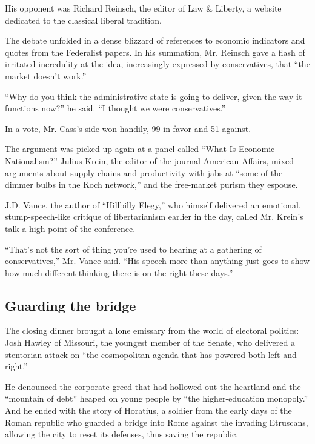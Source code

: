 His opponent was Richard Reinsch, the editor of Law \& Liberty, a
website dedicated to the classical liberal tradition.

The debate unfolded in a dense blizzard of references to economic
indicators and quotes from the Federalist papers. In his summation, Mr.
Reinsch gave a flash of irritated incredulity at the idea, increasingly
expressed by conservatives, that ``the market doesn't work.''

``Why do you think
\href{https://www.nytimes3xbfgragh.onion/2018/03/26/us/politics/trump-judges-courts-administrative-state.html}{the
administrative state} is going to deliver, given the way it functions
now?'' he said. ``I thought we were conservatives.''

In a vote, Mr. Cass's side won handily, 99 in favor and 51 against.

The argument was picked up again at a panel called ``What Is Economic
Nationalism?'' Julius Krein, the editor of the journal
\href{https://www.nytimes3xbfgragh.onion/2017/03/08/arts/american-affairs-journal-donald-trump.html}{American
Affairs}, mixed arguments about supply chains and productivity with jabs
at ``some of the dimmer bulbs in the Koch network,'' and the free-market
purism they espouse.

J.D. Vance, the author of ``Hillbilly Elegy,'' who himself delivered an
emotional, stump-speech-like critique of libertarianism earlier in the
day, called Mr. Krein's talk a high point of the conference.

``That's not the sort of thing you're used to hearing at a gathering of
conservatives,'' Mr. Vance said. ``His speech more than anything just
goes to show how much different thinking there is on the right these
days.''

\hypertarget{guarding-the-bridge}{%
\subsection{Guarding the bridge}\label{guarding-the-bridge}}

The closing dinner brought a lone emissary from the world of electoral
politics: Josh Hawley of Missouri, the youngest member of the Senate,
who delivered a stentorian attack on ``the cosmopolitan agenda that has
powered both left and right.''

He denounced the corporate greed that had hollowed out the heartland and
the ``mountain of debt'' heaped on young people by ``the
higher-education monopoly.'' And he ended with the story of Horatius, a
soldier from the early days of the Roman republic who guarded a bridge
into Rome against the invading Etruscans, allowing the city to reset its
defenses, thus saving the republic.

